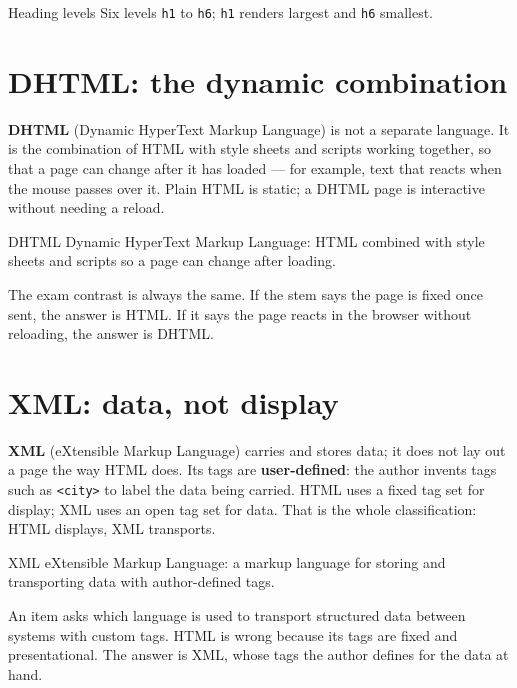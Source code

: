 \begin{definitionbox}{Heading levels}
Six levels \texttt{h1} to \texttt{h6}; \texttt{h1} renders largest and \texttt{h6} smallest.
\end{definitionbox}

\section{DHTML: the dynamic combination}
\textbf{DHTML} (Dynamic HyperText Markup Language) is not a separate language. It is the combination of HTML with style sheets and scripts working together, so that a page can change after it has loaded --- for example, text that reacts when the mouse passes over it. Plain HTML is static; a DHTML page is interactive without needing a reload.

\begin{definitionbox}{DHTML}
Dynamic HyperText Markup Language: HTML combined with style sheets and scripts so a page can change after loading.
\end{definitionbox}

The exam contrast is always the same. If the stem says the page is fixed once sent, the answer is HTML. If it says the page reacts in the browser without reloading, the answer is DHTML.

\section{XML: data, not display}
\textbf{XML} (eXtensible Markup Language) carries and stores data; it does not lay out a page the way HTML does. Its tags are \textbf{user-defined}: the author invents tags such as \texttt{<city>} to label the data being carried. HTML uses a fixed tag set for display; XML uses an open tag set for data. That is the whole classification: HTML displays, XML transports.

\begin{definitionbox}{XML}
eXtensible Markup Language: a markup language for storing and transporting data with author-defined tags.
\end{definitionbox}

\begin{example}
An item asks which language is used to transport structured data between systems with custom tags. HTML is wrong because its tags are fixed and presentational. The answer is XML, whose tags the author defines for the data at hand.
\end{example}

